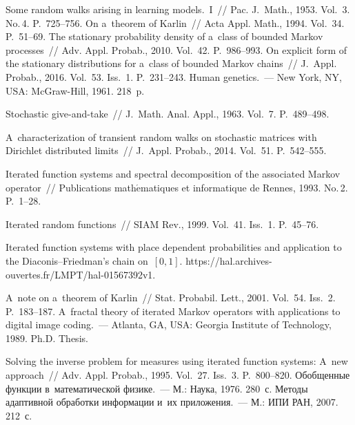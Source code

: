 \begin{multicols}{2}
{\small\frenchspacing
 {%
 \begin{thebibliography}{99}
   Some random walks arising in learning models.~I~// 
  Pac. J.~Math., 1953. 
Vol.~3. No.\,4. P.~725--756.
   On a~theorem of Karlin~// Acta Appl. Math., 1994. Vol.~34. P.~51--69.
   The stationary probability density of a~class of bounded Markov 
processes~// Adv. Appl. Probab., 2010. Vol.~42. P.~986--993.
   On explicit form of the stationary distributions for a~class of 
bounded Markov chains~// J.~Appl. Probab., 2016. Vol.~53. Iss.~1. P.~231--243. 
   Human genetics.~--- New York, NY, USA: McGraw-Hill, 1961. 218~p.
 
   Stochastic give-and-take~// J.~Math. Anal. Appl., 1963. 
Vol.~7. P.~489--498.

   A~characterization of transient random walks on stochastic matrices with 
Dirichlet distributed limits~// J.~Appl. Probab., 2014. Vol.~51. P.~542--555.

   Iterated function systems and spectral decomposition of 
the associated Markov operator~// Publications math$\acute{\mbox{e}}$matiques et 
informatique de Rennes, 1993. No.\,2. P.~1--28.

\pagebreak

   Iterated random functions~// SIAM Rev., 1999. Vol.~41. 
Iss.~1. P.~45--76.



   Iterated function systems with place 
dependent probabilities and application to the Diaconis--Friedman's chain on~$[0,1]$. {\sf 
https://hal.archives-ouvertes.fr/LMPT/hal-01567392v1}.
 
   A~note on a~theorem of Karlin~// Stat. Probabil. 
Lett., 2001. Vol.~54. Iss.~2. P.~183--187.
   A~fractal theory of iterated Markov operators with applications to digital 
image coding.~--- Atlanta,
 GA, USA: Georgia Institute of Technology, 1989. Ph.D. Thesis.
 

 
   Solving the inverse problem for measures using iterated 
function systems: A~new approach~// Adv. Appl. Probab., 1995. 
Vol.~27. Iss.~3. P.~800--820.
   Обобщенные функции в~математической физике.~--- М.: 
Наука, 1976. 280~с.
   Методы адаптивной обработки информации и~их  
приложения.~--- М.: ИПИ РАН, 2007. 212~с.

 \end{thebibliography}

 }
 }

\end{multicols}

